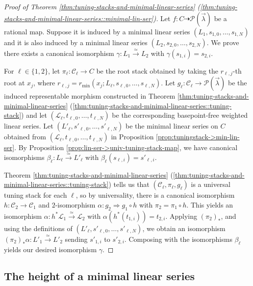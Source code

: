 \documentclass[a4paper,12pt]{amsart}
\theoremstyle{definition}
\newcommand{\cC}{\mathcal{C}}
\newcommand{\Pcv}{\mathcal{P}(\vec{\lambda})}
\begin{document}
	\begin{proof}[{Proof of Theorem \ref{thm:tuning-stacks-and-minimal-linear-series} (\ref{thm:tuning-stacks-and-minimal-linear-series::minimal-lin-ser})}]
		Let $f\colon C\dasharrow\Pcv$ be a rational map. Suppose it is induced by a minimal linear series $(L_1,s_{1,0},\dots,s_{1,N})$ and it is also induced by a minimal linear series $(L_2,s_{2,0},\dots,s_{2,N})$. We prove there exists a canonical isomorphism $\gamma\colon L_1\xrightarrow{\simeq} L_2$ with $\gamma(s_{1,i})=s_{2,i}$.
		
		For $\ell\in\{1,2\}$, let $\pi_\ell\colon\cC_\ell\to C$ be the root stack obtained by taking the $r_{\ell,j}$-th root at $x_j$, where $r_{\ell,j}=r_{\min}(x_j;L_\ell,s_{\ell,0},\dots,s_{\ell,N})$. Let $g_\ell\colon\cC_\ell\to\Pcv$ be the induced representable morphism constructed in Theorem \ref{thm:tuning-stacks-and-minimal-linear-series} (\ref{thm:tuning-stacks-and-minimal-linear-series::tuning-stack}) and let $(\mathcal{L}_\ell,t_{\ell,0},\dots,t_{\ell,N})$ be the corresponding basepoint-free weighted linear series. Let $(L'_\ell,s'_{\ell,0},\dots,s'_{\ell,N})$ be the minimal linear series on $C$ obtained from $(\mathcal{L}_\ell,t_{\ell,0},\dots,t_{\ell,N})$ in Proposition \ref{prop:tuningstack->min-lin-ser}. By Proposition \ref{prop:lin-ser->univ-tuning-stack-map}, we have canonical isomorphisms $\beta_\ell\colon L_\ell\xrightarrow{\simeq} L'_\ell$ with $\beta_\ell(s_{\ell,i})=s'_{\ell,i}$.
		
		Theorem \ref{thm:tuning-stacks-and-minimal-linear-series} (\ref{thm:tuning-stacks-and-minimal-linear-series::tuning-stack}) tells us that $(\cC_\ell,\pi_\ell,g_\ell)$ is a universal tuning stack for each $\ell$, so by universality, there is a canonical isomorphism $h\colon\cC_2\to\cC_1$ and $2$-isomorphism $\alpha\colon g_2\Rightarrow g_1\circ h$ with $\pi_2=\pi_1\circ h$. This yields an isomorphism $\alpha\colon h^*\mathcal{L}_1\xrightarrow{\simeq}\mathcal{L}_2$ with $\alpha(h^*(t_{1,i}))=t_{2,i}$. Applying $(\pi_2)_*$, and using the definitions of $(L'_\ell,s'_{\ell,0},\dots,s'_{\ell,N})$, we obtain an isomorphism $(\pi_2)_*\alpha\colon L'_1\xrightarrow{\simeq} L'_2$ sending $s'_{1,i}$ to $s'_{2,i}$. Composing with the isomorphisms $\beta_\ell$ yields our desired isomorphism $\gamma$.
	\end{proof}
	
	\subsection{The height of a minimal linear series}
	
\end{document}
